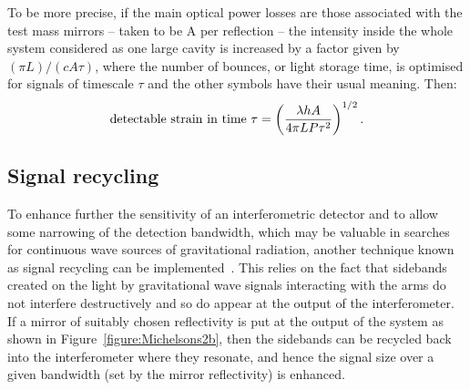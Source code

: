 \documentclass{article}
\begin{document}

To be more precise, if the main optical power losses are those associated with
the test mass mirrors -- taken to be A per reflection -- the intensity inside
the whole system considered as one large cavity is increased by a factor given
by $(\pi L)/(c A \tau)$, where the number of bounces, or light storage time, is
optimised for signals of timescale $\tau$ and the other symbols have their usual
meaning. Then:
%
\begin{equation}
  {\rm detectable\ strain\ in\ time\ } \tau = \left( \frac{\lambda h
  A}{4 \pi L P \tau^2} \right)^{1/2}.
  \label{equation:shotpower}
\end{equation}


\subsection{Signal recycling}
\label{subsection:sigrec}

To enhance further the sensitivity of an interferometric detector and to allow
some narrowing of the detection bandwidth, which may be valuable in searches for
continuous wave sources of gravitational radiation, another technique known as
signal recycling can be implemented~\cite{Meers, Strain, Heinzel}. This relies
on the fact that sidebands created on the light by gravitational wave signals
interacting with the arms do not interfere destructively and so do appear at the
output of the interferometer. If a mirror of suitably chosen reflectivity is put
at the output of the system as shown in Figure~\ref{figure:Michelsons2b}, then the
sidebands can be recycled back into the interferometer where they resonate, and
hence the signal size over a given bandwidth (set by the mirror reflectivity) is
enhanced.
\end{document}
